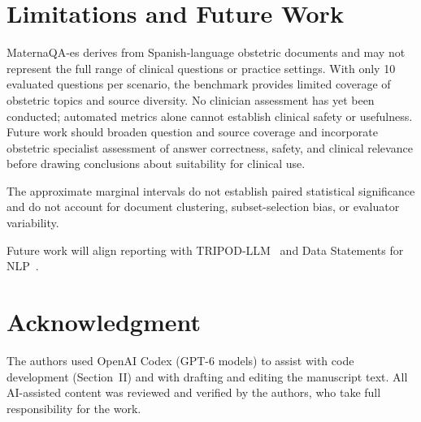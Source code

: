 \section{Limitations and Future Work}
MaternaQA-es derives from Spanish-language obstetric documents and may not
represent the full range of clinical questions or practice settings. With
only 10 evaluated questions per scenario, the benchmark provides limited
coverage of obstetric topics and source diversity. No clinician assessment
has yet been conducted; automated metrics alone cannot establish clinical
safety or usefulness. Future work should broaden question and source
coverage and incorporate obstetric specialist assessment of answer
correctness, safety, and clinical relevance before drawing conclusions
about suitability for clinical use.

The approximate marginal intervals do not establish paired statistical
significance and do not account for document clustering, subset-selection
bias, or evaluator variability.

Future work will align reporting with TRIPOD-LLM~\cite{gallifant2025tripod}
and Data Statements for NLP~\cite{bender2018data}.

\section*{Acknowledgment}
The authors used OpenAI Codex (GPT-6 models) to assist with code development
(Section~II) and with drafting and editing the manuscript text. All
AI-assisted content was reviewed and verified by the authors, who take full
responsibility for the work.





